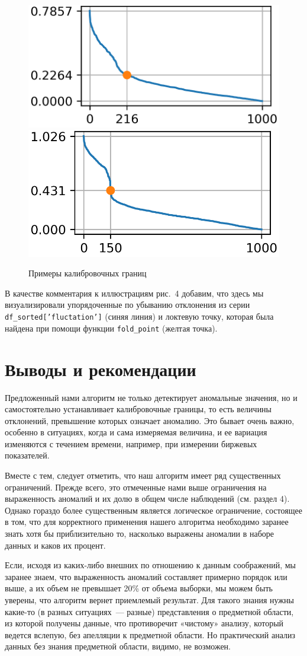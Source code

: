 \documentclass[a4paper,12pt]{article}
\begin{document}
\begin{figure}[!h]
	\centering
	\includegraphics[width=0.4\linewidth]{pictures/bound 6}
	\hspace{0.05\linewidth}
	\includegraphics[width=0.4\linewidth]{pictures/bound 9}\\
	\caption{Примеры калибровочных границ}
\end{figure}

В качестве комментария к иллюстрациям рис. 4 добавим, что здесь мы визуализировали упорядоченные по убыванию отклонения из серии \texttt{df\_sorted['fluctation']} (синяя линия) и локтевую точку, которая была найдена при помощи функции \texttt{fold\_point} (желтая точка).


\section{Выводы и рекомендации}

Предложенный нами алгоритм не только детектирует аномальные значения, но и самостоятельно устанавливает калибровочные границы, то есть величины отклонений, превышение которых означает аномалию. Это бывает очень важно, особенно в ситуациях, когда и сама измеряемая величина, и ее вариация изменяются с течением времени, например, при измерении биржевых показателей.

Вместе с тем, следует отметить, что наш алгоритм имеет ряд существенных ограничений. Прежде всего, это отмеченные нами выше ограничения на выраженность аномалий и их долю в общем числе наблюдений (см. раздел 4). Однако гораздо более существенным является логическое ограничение, состоящее в том, что для корректного применения нашего алгоритма необходимо заранее знать хотя бы приблизительно то,  насколько выражены аномалии в наборе данных и каков их процент. 

Если, исходя из каких-либо внешних по отношению к данным соображений, мы заранее знаем, что выраженность аномалий составляет примерно порядок или выше, а их объем не превышает 20\% от объема выборки, мы можем быть уверены, что алгоритм вернет приемлемый результат. Для такого знания нужны какие-то (в разных ситуациях — разные) представления о предметной области, из которой получены данные, что противоречит «чистому» анализу, который ведется вслепую, без апелляции к предметной области.
Но практический анализ данных без знания предметной области, видимо, не возможен.
\end{document}
